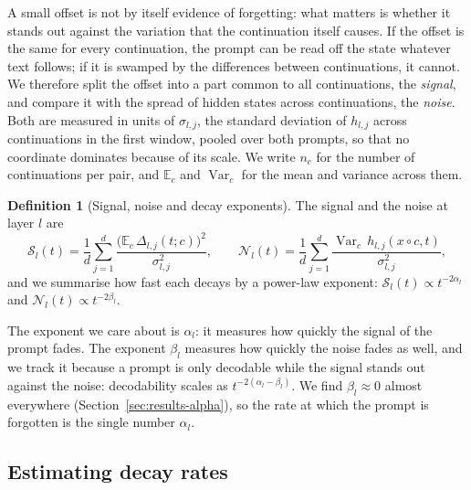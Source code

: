 \documentclass[11pt]{article}
\theoremstyle{definition}
\newtheorem{definition}{Definition}
\theoremstyle{remark}
\begin{document}
A small offset is not by itself evidence of forgetting: what matters is whether it stands out against the variation that the continuation itself causes. If the offset is the same for every continuation, the prompt can be read off the state whatever text follows; if it is swamped by the differences between continuations, it cannot. We therefore split the offset into a part common to all continuations, the \emph{signal}, and compare it with the spread of hidden states across continuations, the \emph{noise}. Both are measured in units of $\sigma_{l,j}$, the standard deviation of $h_{l,j}$ across continuations in the first window, pooled over both prompts, so that no coordinate dominates because of its scale. We write $n_c$ for the number of continuations per pair, and $\mathbb E_c$ and $\operatorname{Var}_c$ for the mean and variance across them.

\begin{definition}[Signal, noise and decay exponents]\label{def:signal}
The signal and the noise at layer $l$ are
\begin{equation}\label{eq:SN}
  \mathcal S_l(t)=\frac1d\sum_{j=1}^d\frac{\big(\mathbb E_c\,\Delta_{l,j}(t;c)\big)^2}{\sigma_{l,j}^2},\qquad
  \mathcal N_l(t)=\frac1d\sum_{j=1}^d\frac{\operatorname{Var}_c\,h_{l,j}(x\circ c,t)}{\sigma_{l,j}^2},
\end{equation}
and we summarise how fast each decays by a power-law exponent: $\mathcal S_l(t)\propto t^{-2\alpha_l}$ and $\mathcal N_l(t)\propto t^{-2\beta_l}$.
\end{definition}

The exponent we care about is $\alpha_l$: it measures how quickly the signal of the prompt fades. The exponent $\beta_l$ measures how quickly the noise fades as well, and we track it because a prompt is only decodable while the signal stands out against the noise: decodability scales as $t^{-2(\alpha_l-\beta_l)}$. We find $\beta_l\approx0$ almost everywhere (Section~\ref{sec:results-alpha}), so the rate at which the prompt is forgotten is the single number $\alpha_l$.

\subsection{Estimating decay rates}\label{sec:measure-est}
\end{document}
